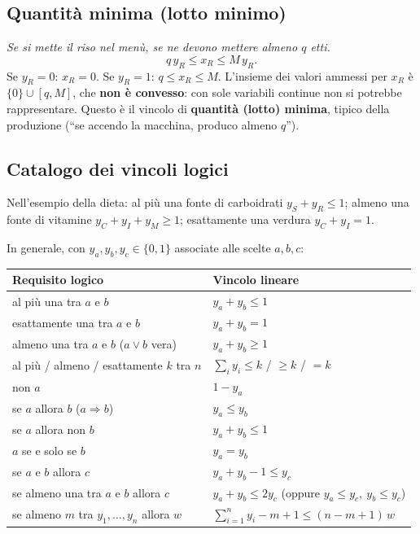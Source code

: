 \subsection{Quantità minima (lotto minimo)}

\emph{Se si mette il riso nel menù, se ne devono mettere almeno $q$ etti.}
\[ q\,y_R\le x_R\le M\,y_R. \]
Se $y_R=0$: $x_R=0$. Se $y_R=1$: $q\le x_R\le M$. L'insieme dei valori ammessi per $x_R$ è $\{0\}\cup[q,M]$, che \textbf{non è convesso}: con sole variabili continue non si potrebbe rappresentare. Questo è il vincolo di \textbf{quantità (lotto) minima}, tipico della produzione (``se accendo la macchina, produco almeno $q$'').

\subsection{Catalogo dei vincoli logici}\label{sec:logici}

Nell'esempio della dieta: al più una fonte di carboidrati $y_S+y_R\le 1$; almeno una fonte di vitamine $y_C+y_I+y_M\ge1$; esattamente una verdura $y_C+y_I=1$.

In generale, con $y_a,y_b,y_c\in\{0,1\}$ associate alle scelte $a,b,c$:

\begin{center}
\renewcommand{\arraystretch}{1.25}
\begin{tabular}{@{}ll@{}}
\toprule
Requisito logico & Vincolo lineare\\ \midrule
al più una tra $a$ e $b$ & $y_a+y_b\le 1$\\
esattamente una tra $a$ e $b$ & $y_a+y_b=1$\\
almeno una tra $a$ e $b$ ($a\lor b$ vera) & $y_a+y_b\ge 1$\\
al più / almeno / esattamente $k$ tra $n$ & $\sum_i y_i\le k$ / $\ge k$ / $=k$\\
non $a$ & $1-y_a$\\
se $a$ allora $b$ ($a\Rightarrow b$) & $y_a\le y_b$\\
se $a$ allora non $b$ & $y_a+y_b\le 1$\\
$a$ se e solo se $b$ & $y_a=y_b$\\
se $a$ e $b$ allora $c$ & $y_a+y_b-1\le y_c$\\
se almeno una tra $a$ e $b$ allora $c$ & $y_a+y_b\le 2y_c$ \quad (oppure $y_a\le y_c,\ y_b\le y_c$)\\
se almeno $m$ tra $y_1,\dots,y_n$ allora $w$ & $\sum_{i=1}^n y_i-m+1\le (n-m+1)\,w$\\
\bottomrule
\end{tabular}
\end{center}

